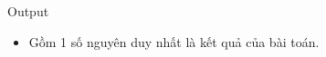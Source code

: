 Output  
\begin{itemize}
	\item     Gồm 1 số nguyên duy nhất là kết quả của bài toán.   
\end{itemize}